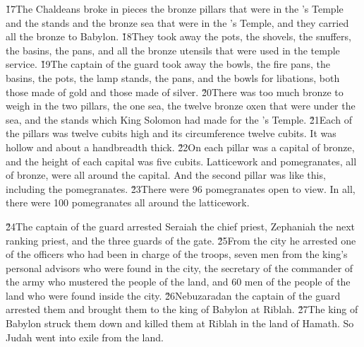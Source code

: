 \v{17}The Chaldeans broke in pieces the bronze pillars that were in the 's Temple and the stands and the bronze sea that were in the 's Temple, and they carried all the bronze to Babylon. \v{18}They took away the pots, the shovels, the snuffers, the basins, the pans, and all the bronze utensils that were used in the temple service. \v{19}The captain of the guard took away the bowls, the fire pans, the basins, the pots, the lamp stands, the pans, and the bowls for libations, both those made of gold and those made of silver. \v{20}There was too much bronze to weigh in the two pillars, the one sea, the twelve bronze oxen that were under the sea, and the stands which King Solomon had made for the 's Temple. \v{21}Each of the pillars was twelve cubits high and its circumference twelve cubits. It was hollow and about a handbreadth thick. \v{22}On each pillar was a capital of bronze, and the height of each capital was five cubits. Latticework and pomegranates, all of bronze, were all around the capital. And the second pillar was like this, including the pomegranates. \v{23}There were 96 pomegranates open to view. In all, there were 100 pomegranates all around the latticework.

\v{24}The captain of the guard arrested Seraiah the chief priest, Zephaniah the next ranking priest, and the three guards of the gate. \v{25}From the city he arrested one of the officers who had been in charge of the troops, seven men from the king's personal advisors who were found in the city, the secretary of the commander of the army who mustered the people of the land, and 60 men of the people of the land who were found inside the city. \v{26}Nebuzaradan the captain of the guard arrested them and brought them to the king of Babylon at Riblah. \v{27}The king of Babylon struck them down and killed them at Riblah in the land of Hamath. So Judah went into exile from the land.

